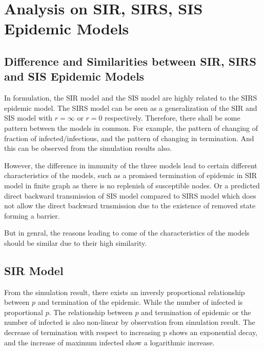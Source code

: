 \documentclass{subfile}
\begin{document}
  \section{Analysis on SIR, SIRS, SIS Epidemic Models}
  \subsection{Difference and Similarities between SIR, SIRS and SIS Epidemic Models}
  In formulation, the SIR model and the SIS model are highly related to the SIRS epidemic model. The SIRS model can be seen as a generalization of the SIR and SIS model with \(r=\infty\) or \(r=0\) respectively. Therefore, there shall be some pattern between the models in common. For example, the pattern of changing of fraction of infected/infectious, and the pattern of changing in termination. And this can be observed from the simulation results also.

  However, the difference in immunity of the three models lead to certain different characteristics of the models, such as a promised termination of epidemic in SIR model in finite graph as there is no replenish of susceptible nodes. Or a predicted direct backward transmission of SIS model compared to SIRS model which does not allow the direct backward trnsmission due to the existence of removed state forming a barrier.

  But in genral, the reasons leading to come of the characteristics of the models should be similar due to their high similarity.

  \subsection{SIR Model}
  From the simulation result, there exists an inversly proportional relationship between \(p\) and termination of the epidemic. While the number of infected is proportional \(p\). The relationship between \(p\) and termination of epidemic or the number of infected is also non-linear by observation from simulation result. The decrease of termination with respect to increasing p shows an exponential decay, and the increase of maximum infected show a logarithmic increase.
\end{document}
